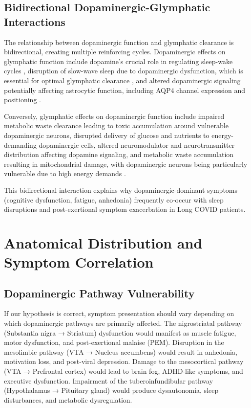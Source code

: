 \documentclass[12pt]{article}
\begin{document}
\subsection{Bidirectional Dopaminergic-Glymphatic Interactions}

The relationship between dopaminergic function and glymphatic clearance is bidirectional, creating multiple reinforcing cycles. Dopaminergic effects on glymphatic function include dopamine's crucial role in regulating sleep-wake cycles \citep{dzirasa2006}, disruption of slow-wave sleep due to dopaminergic dysfunction, which is essential for optimal glymphatic clearance \citep{Xie2013}, and altered dopaminergic signaling potentially affecting astrocytic function, including AQP4 channel expression and positioning \citep{diCastro2018}.

Conversely, glymphatic effects on dopaminergic function include impaired metabolic waste clearance leading to toxic accumulation around vulnerable dopaminergic neurons, disrupted delivery of glucose and nutrients to energy-demanding dopaminergic cells, altered neuromodulator and neurotransmitter distribution affecting dopamine signaling, and metabolic waste accumulation resulting in mitochondrial damage, with dopaminergic neurons being particularly vulnerable due to high energy demands \citep{stefano2021mitochondria}.

This bidirectional interaction explains why dopaminergic-dominant symptoms (cognitive dysfunction, fatigue, anhedonia) frequently co-occur with sleep disruptions and post-exertional symptom exacerbation in Long COVID patients.

\section{Anatomical Distribution and Symptom Correlation}

\subsection{Dopaminergic Pathway Vulnerability}

If our hypothesis is correct, symptom presentation should vary depending on which dopaminergic pathways are primarily affected. The nigrostriatal pathway (Substantia nigra → Striatum) dysfunction would manifest as muscle fatigue, motor dysfunction, and post-exertional malaise (PEM). Disruption in the mesolimbic pathway (VTA → Nucleus accumbens) would result in anhedonia, motivation loss, and post-viral depression. Damage to the mesocortical pathway (VTA → Prefrontal cortex) would lead to brain fog, ADHD-like symptoms, and executive dysfunction. Impairment of the tuberoinfundibular pathway (Hypothalamus → Pituitary gland) would produce dysautonomia, sleep disturbances, and metabolic dysregulation.
\end{document}
